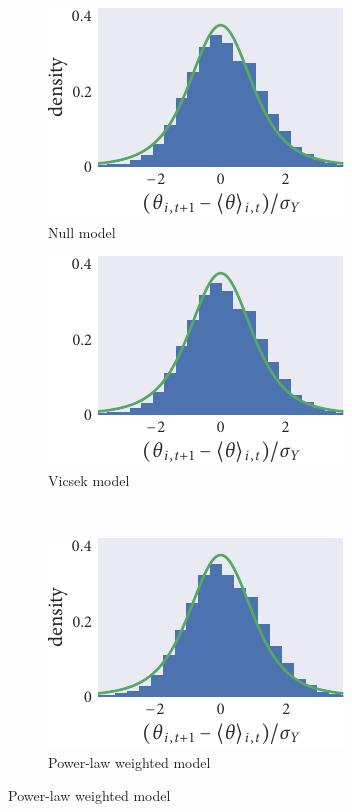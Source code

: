 \begin{figure}
  \begin{subfigure}[b]{0.33333\textwidth}
    \caption{Null model}
    \includegraphics{seq1/null_residuals.pdf}
  \end{subfigure}\hspace{2pt}
  \begin{subfigure}[b]{0.33333\textwidth}
    \caption{Vicsek model}
    \includegraphics{seq1/r_residuals.pdf}
  \end{subfigure}\vspace{1em}\\
  \begin{subfigure}[b]{0.33333\textwidth}
    \includegraphics{seq1/power_residuals.pdf}
    \caption{Power-law weighted model}

\end{subfigure}
\end{figure}
